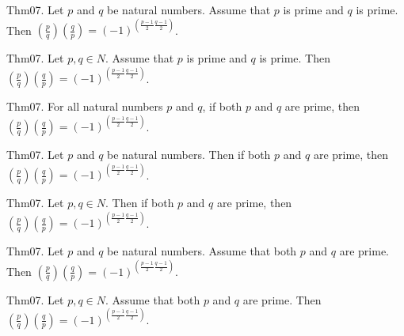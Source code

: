 \documentclass{article}
\begin{document}
Thm07. Let $p$ and $q$ be natural numbers. Assume that $p$ is prime and $q$ is prime. Then $\left(\frac{ p }{ q }\right) \left(\frac{ q }{ p }\right) = {(- 1)}^{ (\frac{ p - 1 }{ 2}\frac{ q - 1 }{ 2})}$.

Thm07. Let $p , q \in N$. Assume that $p$ is prime and $q$ is prime. Then $\left(\frac{ p }{ q }\right) \left(\frac{ q }{ p }\right) = {(- 1)}^{ (\frac{ p - 1 }{ 2}\frac{ q - 1 }{ 2})}$.

Thm07. For all natural numbers $p$ and $q$, if both $p$ and $q$ are prime, then $\left(\frac{ p }{ q }\right) \left(\frac{ q }{ p }\right) = {(- 1)}^{ (\frac{ p - 1 }{ 2}\frac{ q - 1 }{ 2})}$.

Thm07. Let $p$ and $q$ be natural numbers. Then if both $p$ and $q$ are prime, then $\left(\frac{ p }{ q }\right) \left(\frac{ q }{ p }\right) = {(- 1)}^{ (\frac{ p - 1 }{ 2}\frac{ q - 1 }{ 2})}$.

Thm07. Let $p , q \in N$. Then if both $p$ and $q$ are prime, then $\left(\frac{ p }{ q }\right) \left(\frac{ q }{ p }\right) = {(- 1)}^{ (\frac{ p - 1 }{ 2}\frac{ q - 1 }{ 2})}$.

Thm07. Let $p$ and $q$ be natural numbers. Assume that both $p$ and $q$ are prime. Then $\left(\frac{ p }{ q }\right) \left(\frac{ q }{ p }\right) = {(- 1)}^{ (\frac{ p - 1 }{ 2}\frac{ q - 1 }{ 2})}$.

Thm07. Let $p , q \in N$. Assume that both $p$ and $q$ are prime. Then $\left(\frac{ p }{ q }\right) \left(\frac{ q }{ p }\right) = {(- 1)}^{ (\frac{ p - 1 }{ 2}\frac{ q - 1 }{ 2})}$.
\end{document}
